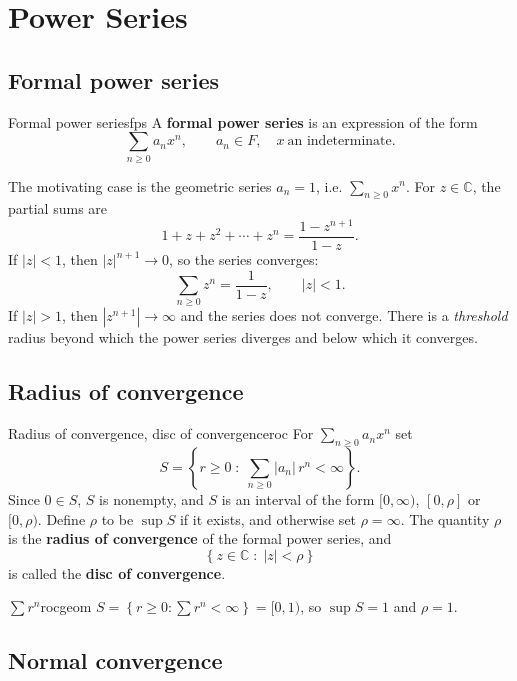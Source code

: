 \documentclass[11pt,openany]{report}
\newcommand{\C}{\mathbb{C}}
\newcommand{\abs}[1]{\left\lvert #1 \right\rvert}
\newcommand{\set}[1]{\left\{ #1 \right\}}
\begin{document}
\chapter{Power Series}

\section{Formal power series}

\begin{definition}{Formal power series}{fps}
A \textbf{formal power series} is an expression of the form
\[
  \sum_{n\ge0} a_n x^n, \qquad a_n\in F, \quad x\ \text{an indeterminate}.
\]
\end{definition}

The motivating case is the geometric series $a_n=1$, i.e. $\sum_{n\ge0}x^n$. For $z\in\C$,
the partial sums are
\[
  1+z+z^2+\cdots+z^n = \frac{1-z^{n+1}}{1-z}.
\]
If $\abs{z}<1$, then $\abs{z}^{n+1}\to0$, so the series converges:
\[
  \sum_{n\ge0} z^n = \frac{1}{1-z}, \qquad \abs{z}<1.
\]
If $\abs{z}>1$, then $\abs{z^{n+1}}\to\infty$ and the series does not converge. There is a
\emph{threshold} radius beyond which the power series diverges and below which it
converges.

\section{Radius of convergence}

\begin{definition}{Radius of convergence, disc of convergence}{roc}
For $\sum_{n\ge0}a_n x^n$ set
\[
  S = \set{ r\ge0 \;:\; \sum_{n\ge0}\abs{a_n}\,r^{n} < \infty }.
\]
Since $0\in S$, $S$ is nonempty, and $S$ is an interval of the form $[0,\infty)$, $[0,\rho]$
or $[0,\rho)$. Define $\rho$ to be $\sup S$ if it exists, and otherwise set
$\rho=\infty$. The quantity $\rho$ is the \textbf{radius of convergence} of the formal
power series, and
\[
  \set{ z\in\C \;:\; \abs{z}<\rho }
\]
is called the \textbf{disc of convergence}.
\end{definition}

\begin{example}{$\sum r^n$}{rocgeom}
$S=\set{ r\ge0 : \sum r^n<\infty } = [0,1)$, so $\sup S = 1$ and $\rho=1$.
\end{example}

\section{Normal convergence}
\end{document}
